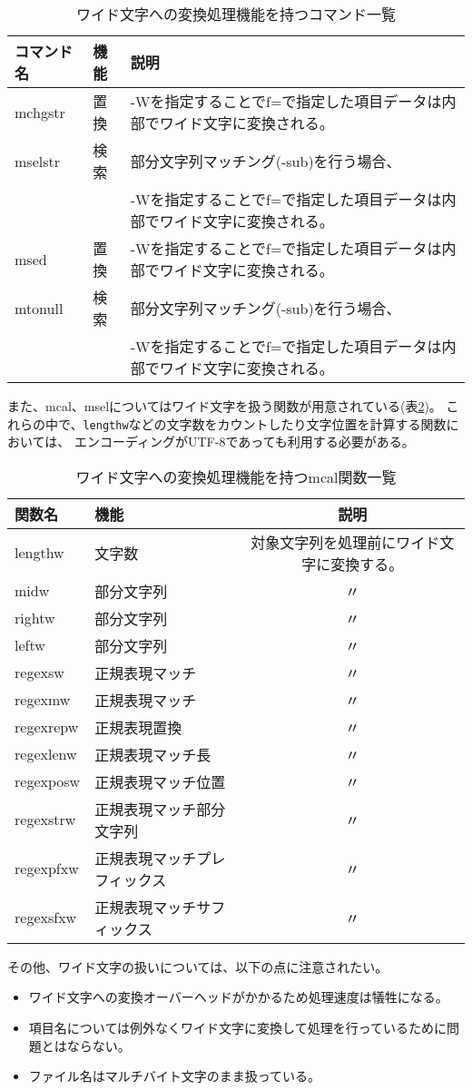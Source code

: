 \begin{table}[htbp]
\begin{center}
\caption{ワイド文字への変換処理機能を持つコマンド一覧\label{tbl:wide_cmd}}
\begin{tabular}{lll}
\hline
コマンド名 & 機能 & 説明 \\
\hline
mchgstr & 置換 & -Wを指定することでf=で指定した項目データは内部でワイド文字に変換される。 \\
mselstr & 検索 & 部分文字列マッチング(-sub)を行う場合、\\
        &      & -Wを指定することでf=で指定した項目データは内部でワイド文字に変換される。 \\
msed    & 置換 & -Wを指定することでf=で指定した項目データは内部でワイド文字に変換される。 \\
mtonull & 検索 & 部分文字列マッチング(-sub)を行う場合、\\
        &      & -Wを指定することでf=で指定した項目データは内部でワイド文字に変換される。 \\
\hline
\end{tabular}
\end{center}
\end{table}

また、mcal、mselについてはワイド文字を扱う関数が用意されている(表\ref{tbl:wide_mcal})。
これらの中で、\verb|lengthw|などの文字数をカウントしたり文字位置を計算する関数においては、
エンコーディングがUTF-8であっても利用する必要がある。

\begin{table}[htbp]
\begin{center}
\caption{ワイド文字への変換処理機能を持つmcal関数一覧\label{tbl:wide_mcal}}
\begin{tabular}{llc}
\hline
関数名    & 機能 & 説明 \\
\hline
lengthw   & 文字数     & 対象文字列を処理前にワイド文字に変換する。 \\
midw      & 部分文字列 & 〃 \\
rightw    & 部分文字列 & 〃  \\
leftw     & 部分文字列 & 〃  \\
regexsw   & 正規表現マッチ & 〃  \\
regexmw   & 正規表現マッチ & 〃  \\
regexrepw & 正規表現置換   & 〃  \\
regexlenw & 正規表現マッチ長 & 〃  \\
regexposw & 正規表現マッチ位置 & 〃  \\
regexstrw & 正規表現マッチ部分文字列 & 〃  \\
regexpfxw & 正規表現マッチプレフィックス & 〃  \\
regexsfxw & 正規表現マッチサフィックス & 〃  \\
\hline
\end{tabular}
\end{center}
\end{table}

その他、ワイド文字の扱いについては、以下の点に注意されたい。
\begin{itemize}
\item ワイド文字への変換オーバーヘッドがかかるため処理速度は犠牲になる。
\item 項目名については例外なくワイド文字に変換して処理を行っているために問題とはならない。
\item ファイル名はマルチバイト文字のまま扱っている。
\end{itemize}

%


